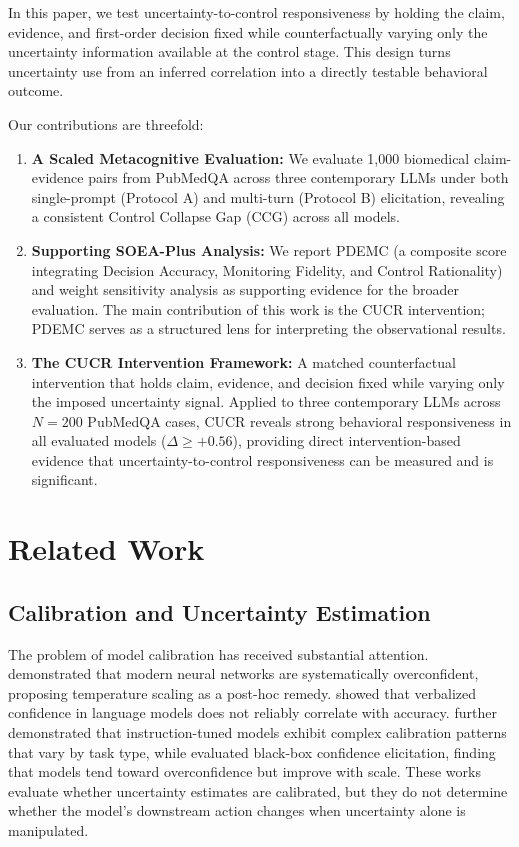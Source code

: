 \documentclass[11pt]{article}
\begin{document}
In this paper, we test uncertainty-to-control responsiveness by holding the claim, evidence, and first-order decision fixed while counterfactually varying only the uncertainty information available at the control stage. This design turns uncertainty use from an inferred correlation into a directly testable behavioral outcome.

Our contributions are threefold:
\begin{enumerate}
    \item \textbf{A Scaled Metacognitive Evaluation:} We evaluate 1,000 biomedical claim-evidence pairs from PubMedQA across three contemporary LLMs under both single-prompt (Protocol A) and multi-turn (Protocol B) elicitation, revealing a consistent Control Collapse Gap (CCG) across all models.
    \item \textbf{Supporting SOEA-Plus Analysis:} We report PDEMC (a composite score integrating Decision Accuracy, Monitoring Fidelity, and Control Rationality) and weight sensitivity analysis as supporting evidence for the broader evaluation. The main contribution of this work is the CUCR intervention; PDEMC serves as a structured lens for interpreting the observational results.
    \item \textbf{The CUCR Intervention Framework:} A matched counterfactual intervention that holds claim, evidence, and decision fixed while varying only the imposed uncertainty signal. Applied to three contemporary LLMs across $N=200$ PubMedQA cases, CUCR reveals strong behavioral responsiveness in all evaluated models ($\Delta \ge +0.56$), providing direct intervention-based evidence that uncertainty-to-control responsiveness can be measured and is significant.
\end{enumerate}

\section{Related Work}

\subsection{Calibration and Uncertainty Estimation}
The problem of model calibration has received substantial attention. \citet{guo2017calibration} demonstrated that modern neural networks are systematically overconfident, proposing temperature scaling as a post-hoc remedy. \citet{jiang2021calibration} showed that verbalized confidence in language models does not reliably correlate with accuracy. \citet{tian2023just} further demonstrated that instruction-tuned models exhibit complex calibration patterns that vary by task type, while \citet{xiong2024llms} evaluated black-box confidence elicitation, finding that models tend toward overconfidence but improve with scale. These works evaluate whether uncertainty estimates are calibrated, but they do not determine whether the model's downstream action changes when uncertainty alone is manipulated.
\end{document}
